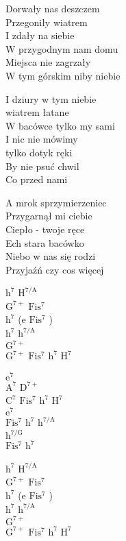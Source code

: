 \begin{text}
    Dorwały nas deszczem\\
    Przegoniły wiatrem\\
    I zdały na siebie\\
    W przygodnym nam domu\\
    Miejsca nie zagrzały\\
    W tym górskim niby niebie

    \vin I dziury w tym niebie\\
    \vin wiatrem łatane\\
    \vin W bacówce tylko my sami\\
    \vin I nic nie mówimy\\
    \vin tylko dotyk ręki\\
    \vin By nie psuć chwil\\
    \vin Co przed nami

    A mrok sprzymierzeniec\\
    Przygarnął mi ciebie\\
    Ciepło - twoje ręce\\
    Ech stara bacówko\\
    Niebo w nas się rodzi\\
    Przyjaźń czy cos więcej
\end{text}
\begin{chord}
    $\mathrm{h^7}$ $\mathrm{H^{7/A}}$\\
    $\mathrm{G^{7+}}$ $\mathrm{Fis^7}$\\
    $\mathrm{h^7}$ (e $\mathrm{Fis^7}$ )\\
    $\mathrm{h^7}$ $\mathrm{h^{7/A}}$\\
    $\mathrm{G^{7+}}$\\
    $\mathrm{G^{7+}}$ $\mathrm{Fis^7}$ $\mathrm{h^7}$ $\mathrm{H^7}$

    $\mathrm{e^7}$\\
    $\mathrm{A^7}$ $\mathrm{D^{7+}}$\\
    $\mathrm{C^7}$ $\mathrm{Fis^7}$ $\mathrm{h^7}$ $\mathrm{H^7}$\\
    $\mathrm{e^7}$\\
    $\mathrm{Fis^7}$ $\mathrm{h^7}$ $\mathrm{h^{7/A}}$\\
    $\mathrm{h^{7/G}}$\\
    $\mathrm{Fis^7}$ $\mathrm{h^7}$

    $\mathrm{h^7}$ $\mathrm{H^{7/A}}$\\
    $\mathrm{G^{7+}}$ $\mathrm{Fis^7}$\\
    $\mathrm{h^7}$ (e $\mathrm{Fis^7}$ )\\
    $\mathrm{h^7}$ $\mathrm{h^{7/A}}$\\
    $\mathrm{G^{7+}}$\\
    $\mathrm{G^{7+}}$ $\mathrm{Fis^7}$ $\mathrm{h^7}$ $\mathrm{H^7}$
\end{chord}
